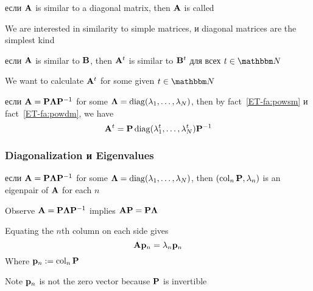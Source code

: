\begin{frame}
   
    \vspace{2em}
    если $\mathbf A$ is similar to a diagonal matrix, then $\mathbf A$ is
    called 
    
    \vspace{.7em}
    We are interested in similarity to simple matrices, и diagonal matrices are the simplest kind 
    
\end{frame}

\begin{frame}

     \vspace{2em}
    \Fact{\eqref{ET-fa:powsm}}
        если $\mathbf A$ is similar to $\mathbf B$, then $\mathbf A^t$ is similar to
        $\mathbf B^t$ для всех $t \in \NN$
    
    \vspace{.7em}
    \Eg
    We want to calculate $\mathbf A^t$ for some given $t \in \NN$ 
    
    если $\mathbf A = \mathbf P {\boldsymbol \Lambda} \mathbf P^{-1}$ for some
    ${\boldsymbol \Lambda} = \operatorname{diag}(\lambda_1, \ldots, \lambda_N)$, then by
    fact~\ref{ET-fa:powsm} и fact~\ref{ET-fa:powdm}, we
    have
        $$\mathbf A^t = \mathbf P \operatorname{diag}(\lambda_1^t, \ldots, \lambda_N^t)
        \mathbf P^{-1}$$
    
\end{frame}

\begin{frame}\frametitle{Diagonalization и Eigenvalues}

    \vspace{.7em}
    \Fact{\eqref{ET-fa:diagee}}
    если $\mathbf A = \mathbf P {\boldsymbol \Lambda} \mathbf P^{-1}$ for some ${\boldsymbol \Lambda} =
        \operatorname{diag}(\lambda_1, \ldots, \lambda_N)$, then $(\operatorname{col}_n \mathbf P,
            \lambda_n)$ is an eigenpair of $\mathbf A$ for each $n$
            
    \vspace{.7em}    
    
    \Prf
    Observe $\mathbf A
    = \mathbf P {\boldsymbol \Lambda} \mathbf P^{-1}$ implies $\mathbf A \mathbf P = \mathbf P {\boldsymbol \Lambda}$
    
    Equating the $n$th column on each side gives 
        $$\mathbf A {\mathbf p}_n = \lambda_n
        {\mathbf p}_n$$
    Where ${\mathbf p}_n := \operatorname{col}_n \mathbf P$
    
    Note  ${\mathbf p}_n$ is not the
    zero vector because $\mathbf P$ is invertible
        
\end{frame}


